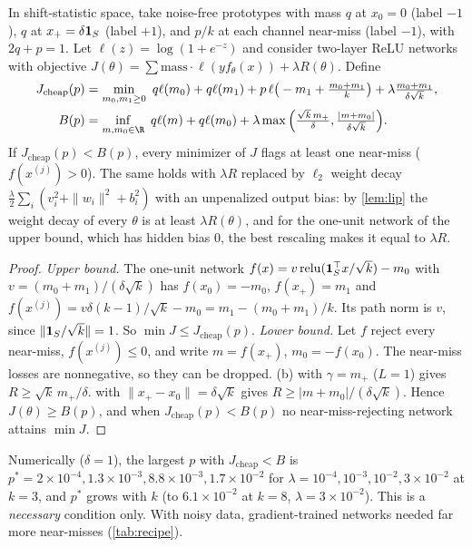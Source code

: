 \begin{proposition}\label{prop:pstar}
In shift-statistic space, take noise-free prototypes with mass $q$ at $x_0=0$ (label $-1$), $q$ at $x_+=\delta\mathbf{1}_S$ (label $+1$), and $p/k$ at each channel near-miss (label $-1$), with $2q+p=1$. Let $\ell(z)=\log(1+e^{-z})$ and consider two-layer ReLU networks with objective $J(\theta)=\sum\mathrm{mass}\cdot\ell(yf_\theta(x))+\lambda R(\theta)$. Define
\begin{align*}
J_{\mathrm{cheap}}(p)&=\min_{m_0,m_1\ge0}\ q\ell(m_0)+q\ell(m_1)+p\,\ell\big(-m_1+\tfrac{m_0+m_1}{k}\big)+\lambda\tfrac{m_0+m_1}{\delta\sqrt k},\\
B(p)&=\inf_{m,m_0\in\R}\ q\ell(m)+q\ell(m_0)+\lambda\max\Big(\tfrac{\sqrt k\,m_+}{\delta},\tfrac{|m+m_0|}{\delta\sqrt k}\Big).
\end{align*}
If $J_{\mathrm{cheap}}(p)<B(p)$, every minimizer of $J$ flags at least one near-miss ($f(x^{(j)})>0$). The same holds with $\lambda R$ replaced by $\ell_2$ weight decay $\frac{\lambda}{2}\sum_i(v_i^2+\|w_i\|^2+b_i^2)$ with an unpenalized output bias: by \cref{lem:lip} the weight decay of every $\theta$ is at least $\lambda R(\theta)$, and for the one-unit network of the upper bound, which has hidden bias $0$, the best rescaling makes it equal to $\lambda R$.
\end{proposition}
\begin{proof}
\emph{Upper bound.} The one-unit network $f(x)=v\,\mathrm{relu}(\mathbf{1}_S^\top x/\sqrt k)-m_0$ with $v=(m_0+m_1)/(\delta\sqrt k)$ has $f(x_0)=-m_0$, $f(x_+)=m_1$ and $f(x^{(j)})=v\delta(k-1)/\sqrt k-m_0=m_1-(m_0+m_1)/k$. Its path norm is $v$, since $\|\mathbf{1}_S/\sqrt k\|=1$. So $\min J\le J_{\mathrm{cheap}}(p)$. \emph{Lower bound.} Let $f$ reject every near-miss, $f(x^{(j)})\le0$, and write $m=f(x_+)$, $m_0=-f(x_0)$. The near-miss losses are nonnegative, so they can be dropped. (b) with $\gamma=m_+$ ($L=1$) gives $R\ge\sqrt k\,m_+/\delta$.  with $\|x_+-x_0\|=\delta\sqrt k$ gives $R\ge|m+m_0|/(\delta\sqrt k)$. Hence $J(\theta)\ge B(p)$, and when $J_{\mathrm{cheap}}(p)<B(p)$ no near-miss-rejecting network attains $\min J$.
\end{proof}
Numerically ($\delta=1$), the largest $p$ with $J_{\mathrm{cheap}}<B$ is $p^*=2\times10^{-4},1.3\times10^{-3},8.8\times10^{-3},1.7\times10^{-2}$ for $\lambda=10^{-4},10^{-3},10^{-2},3\times10^{-2}$ at $k=3$, and $p^*$ grows with $k$ (to $6.1\times10^{-2}$ at $k=8$, $\lambda=3\times10^{-2}$). This is a \emph{necessary} condition only. With noisy data, gradient-trained networks needed far more near-misses (\cref{tab:recipe}).

